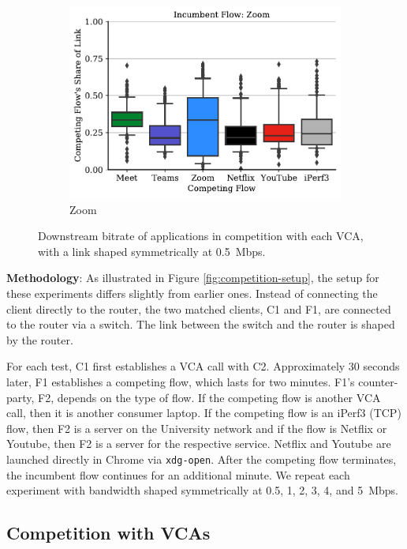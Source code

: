 \begin{figure}[t!]
\begin{subfigure}[t]{.33\textwidth}
    \includegraphics[width=1\textwidth]{figures/comp/box_plot_zoom_dl_0.5.pdf}
    \caption{Zoom}
    \label{fig:zoom_box_1}
\end{subfigure}
\caption{Downstream bitrate of applications in competition with each VCA, with a link shaped symmetrically at 0.5~Mbps.}
\label{fig:dnld-boxplot}
\end{figure}


\noindent \textbf{Methodology}: As illustrated in Figure \ref{fig:competition-setup}, the setup for these experiments differs slightly from earlier ones. 
Instead of connecting the client directly to the router, the two matched clients, C1 and F1, are connected to the router via a switch. 
The link between the switch and the router is shaped by the router.

For each test, C1 first establishes a VCA call with C2.
Approximately 30 seconds later, F1 establishes a competing flow, which lasts for two minutes.
F1's counter-party, F2, depends on the type of flow.
If the competing flow is another VCA call, then it is another consumer laptop.
If the competing flow is an iPerf3 (TCP) flow, then F2 is a server on the University network
  and if the flow is Netflix or Youtube, then F2 is a server for the respective service.
Netflix and Youtube are launched directly in Chrome via \texttt{xdg-open}.
After the competing flow terminates, the incumbent flow continues for an additional minute.
We repeat each experiment with bandwidth shaped symmetrically at 0.5, 1, 2, 3, 4, and 5~Mbps.

\subsection{Competition with VCAs}

